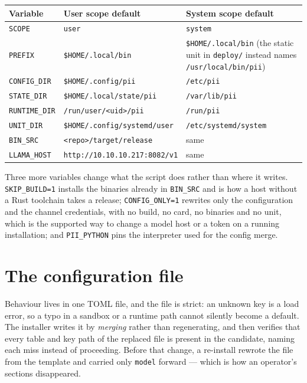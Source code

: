 \begin{longtable}{@{}p{}p{}p{}@{}}
	\toprule
	\textbf{Variable} & \textbf{User scope default} & \textbf{System scope default} \\
	\midrule
	\endhead
	\texttt{SCOPE} & \texttt{user} & \texttt{system} \\
	\texttt{PREFIX} & \texttt{\$HOME/.local/bin} & \texttt{\$HOME/.local/bin} (the static
	unit in \texttt{deploy/} instead names \texttt{/usr/local/bin/pii}) \\
	\texttt{CONFIG\_DIR} & \texttt{\$HOME/.config/pii} & \texttt{/etc/pii} \\
	\texttt{STATE\_DIR} & \texttt{\$HOME/.local/state/pii} & \texttt{/var/lib/pii} \\
	\texttt{RUNTIME\_DIR} & \texttt{/run/user/\textless{}uid\textgreater{}/pii} & \texttt{/run/pii} \\
	\texttt{UNIT\_DIR} & \texttt{\$HOME/.config/systemd/user} & \texttt{/etc/systemd/system} \\
	\texttt{BIN\_SRC} & \texttt{\textless{}repo\textgreater{}/target/release} & same \\
	\texttt{LLAMA\_HOST} & \texttt{http://10.10.10.217:8082/v1} & same \\
	\bottomrule
\end{longtable}

Three more variables change what the script does rather than where it writes.
\texttt{SKIP\_BUILD=1} installs the binaries already in \texttt{BIN\_SRC} and is how a
host without a Rust toolchain takes a release;
\texttt{CONFIG\_ONLY=1} rewrites only the configuration and the channel credentials, with
no build, no card, no binaries and no unit, which is the supported way to change a model
host or a token on a running installation; and \texttt{PII\_PYTHON} pins the interpreter
used for the config merge.

\section{The configuration file}

Behaviour lives in one TOML file, and the file is strict: an unknown key is a load
error, so a typo in a sandbox or a runtime path cannot silently become a default. The
installer writes it by \emph{merging} rather than regenerating, and then verifies that
every table and key path of the replaced file is present in the candidate, naming each
miss instead of proceeding. Before that change, a re-install rewrote the file from the
template and carried only \texttt{model} forward --- which is how an operator's sections
disappeared.

